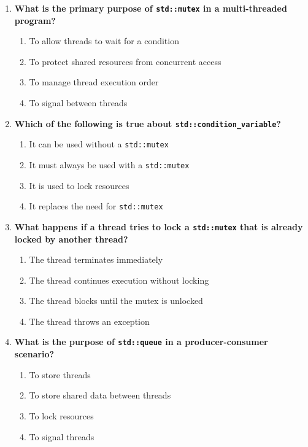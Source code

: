 \documentclass[12pt]{article}
\begin{document}
\begin{enumerate}
    \item \textbf{What is the primary purpose of \texttt{std::mutex} in a multi-threaded program?}
    \begin{enumerate}[label=(\alph*)]
        \item To allow threads to wait for a condition
        \item To protect shared resources from concurrent access
        \item To manage thread execution order
        \item To signal between threads
    \end{enumerate}

    \item \textbf{Which of the following is true about \texttt{std::condition\_variable}?}
    \begin{enumerate}[label=(\alph*)]
        \item It can be used without a \texttt{std::mutex}
        \item It must always be used with a \texttt{std::mutex}
        \item It is used to lock resources
        \item It replaces the need for \texttt{std::mutex}
    \end{enumerate}

    \item \textbf{What happens if a thread tries to lock a \texttt{std::mutex} that is already locked by another thread?}
    \begin{enumerate}[label=(\alph*)]
        \item The thread terminates immediately
        \item The thread continues execution without locking
        \item The thread blocks until the mutex is unlocked
        \item The thread throws an exception
    \end{enumerate}

    \item \textbf{What is the purpose of \texttt{std::queue} in a producer-consumer scenario?}
    \begin{enumerate}[label=(\alph*)]
        \item To store threads
        \item To store shared data between threads
        \item To lock resources
        \item To signal threads
    \end{enumerate}


\end{enumerate}
\end{document}
